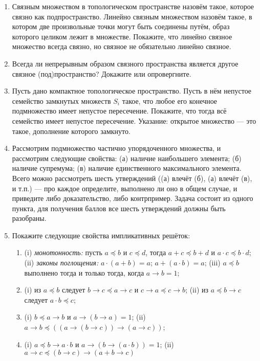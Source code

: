 \documentclass[10pt,a4paper,oneside]{article}
\begin{document}
\begin{enumerate}
\item Связным множеством в топологическом пространстве назовём такое, которое связно как подпространство.
Линейно связным множеством назовём такое, в котором две произвольные точки могут быть соединены путём,
образ которого целиком лежит в множестве. Покажите, что линейно связное множество всегда связно, но связное 
не обязательно линейно связное.

\item Всегда ли непрерывным образом связного пространства является другое связное (под)пространство? Докажите или опровергните.

\item Пусть дано компактное топологическое пространство. Пусть в нём непустое семейство 
замкнутых множеств $S_i$ такое, что любое его
конечное подмножество имеет непустое пересечение. Покажите, что тогда всё семейство имеет
непустое пересечение. Указание: открытое множество --- это такое, дополнение которого замкнуто.

\item Рассмотрим подмножество частично упорядоченного множества, и рассмотрим следующие свойства:
(а) наличие наибольшего элемента; (б) наличие супремума;
(в) наличие единственного максимального элемента. Всего можно рассмотреть шесть утверждений ((а) влечёт (б), 
(а) влечёт (в), и т.п.) --- про каждое определите, выполнено ли оно в общем случае,
и приведите либо доказательство, либо контрпример. Задача состоит из одного пункта, для получения баллов 
все шесть утверждений должны быть разобраны.

\item Покажите следующие свойства импликативных решёток:
\begin{enumerate}
\item (i) \emph{монотонность:} пусть $a \preceq b$ и $c \preceq d$, тогда $a + c \preceq b + d$ и $a \cdot c \preceq b \cdot d$;
(ii) \emph{законы поглощения:} $a \cdot (a + b) = a$; $a + (a \cdot b) = a$; 
(iii) $a \preceq b$ выполнено тогда и только тогда, когда $a \rightarrow b = 1$;
\item (i) из $a \preceq b$ следует $b\rightarrow c \preceq a\rightarrow c$ и $c\rightarrow a \preceq c \rightarrow b$;
 (ii) из $a \preceq b \rightarrow c$ следует $a \cdot b \preceq c$;
\item (i) $b \preceq a \rightarrow b$ и $a \rightarrow (b \rightarrow a) = 1$;
 (ii) $a \rightarrow b \preceq ((a \rightarrow (b \rightarrow c)) \rightarrow (a \rightarrow c))$;
\item  (i) $a \preceq b \rightarrow a \cdot b$ и $a \rightarrow (b \rightarrow (a \cdot b)) = 1$;
 (ii) $a \rightarrow c \preceq (b \rightarrow c) \rightarrow (a + b \rightarrow c)$
\end{enumerate}


\end{enumerate}
\end{document}
